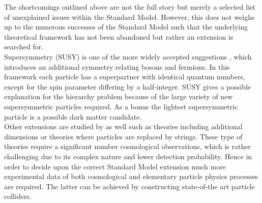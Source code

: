 The shortcomings outlined above are not the full story but merely a selected list of unexplained issues within the Standard Model. 
However, this does not weighs up to the numerous successes of the Standard Model such that the underlying theoretical framework has not been abandoned but rather an extension is searched for.
\\
Supersymmetry (SUSY) is one of the more widely accepted suggestions%
, which introduces an additional symmetry relating bosons and fermions.
In this framework each particle has a superpartner with identical quantum numbers, except for the spin parameter differing by a half-integer.
SUSY gives a possible explanation for the hierarchy problem because of the large variety of new supersymmetric particles required. 
As a bonus the lightest supersymmetric particle is a possible dark matter candidate.
\\
Other extensions are studied by as well such as theories including additional dimensions or theories where particles are replaced by strings. These type of theories require a significant number cosmological observations, which is rather challenging due to its complex nature and lower detection probability. 
Hence in order to decide upon the correct Standard Model extension much more experimental data of both cosmological and elementary particle physics processes are required. The latter can be achieved by constructing state-of-the art particle colliders.

